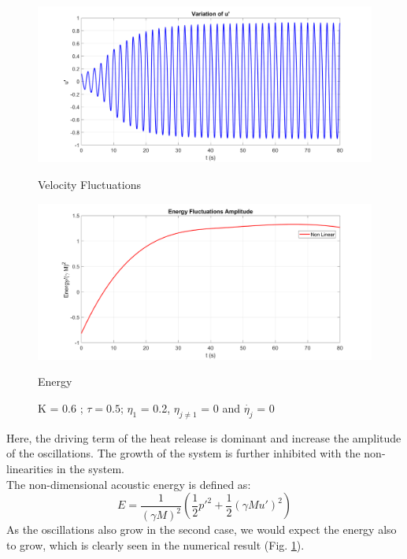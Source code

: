 \documentclass[8pt]{article} %
\begin{document}
\begin{figure}[H]
  \centering
  \begin{minipage}[b]{0.495\linewidth}
    \centering
    \includegraphics[width=\linewidth]{fig4b-k=0.6-tau=0.5}
   \caption{Velocity Fluctuations}
    \label{fig:4b}
  \end{minipage}
  \hfill
  \begin{minipage}[b]{0.495\linewidth}
    \centering
    \includegraphics[width=\linewidth]{fig4d-k=0.6-tau=0.5}
    \caption{Energy}
    \label{fig:4d}
  \end{minipage}
\caption*{K = 0.6 ; $\tau = 0.5$; $\eta_1$ = 0.2, $\eta_{j\neq 1}$ = 0 and $\dot{\eta_j}$ = 0}
\end{figure}
Here, the driving term of the heat release is dominant and increase the amplitude of the oscillations. The growth of the system is further inhibited with the non-linearities in the system.\\
The non-dimensional acoustic energy is defined as:
\begin{equation}
	E = \frac{1}{(\gamma M)^2} \left( \frac{1}{2} p'^2 + \frac{1}{2} (\gamma M u')^2 \right)
\end{equation}
As the oscillations also grow in the second case, we would expect the energy also to grow,
which is clearly seen in the numerical result (Fig. \ref{fig:4d}).\\
\end{document}
